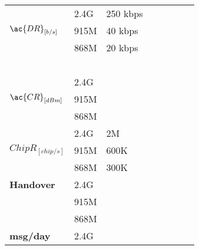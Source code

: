 \begin{longtable}{l|l|l|l|l|l|l|l}
	\multirow{3}{*}{$\ac{DR}_{[b/s]}$} & 2.4G             & 250 kbps     &              &             &             &                 &                 \\
	\                                  & 915M             & 40 kbps      &              &             &             &                 &                 \\
	\                                  & 868M             & 20 kbps      &              &             &             &                 &                 \\
	\                                  &                  &              &              &             &             &                 &                 \\\hline
	\multirow{3}{*}{$\ac{CR}_{[dBm]}$} & 2.4G             &              &              &             &             &                 &                 \\
	\                                  & 915M             &              &              &             &             &                 &                 \\
	\                                  & 868M             &              &              &             &             &                 &                 \\\hline
	\multirow{3}{*}{$Chip R_{[chip/s]}$} & 2.4G           & 2M           &              &             &             &                 &                 \\
	\                                  & 915M             & 600K         &              &             &             &                 &                 \\
	\                                  & 868M             & 300K         &              &             &             &                 &                 \\\hline
	\bf{Handover}                      & 2.4G             &              &              &             &             &                 &                 \\
	\                                  & 915M             &              &              &             &             &                 &                 \\
	\                                  & 868M             &              &              &             &             &                 &                 \\\hline
	\bf{msg/day}                       & 2.4G             &              &              &             &             &                 &                 \\

\end{longtable}
